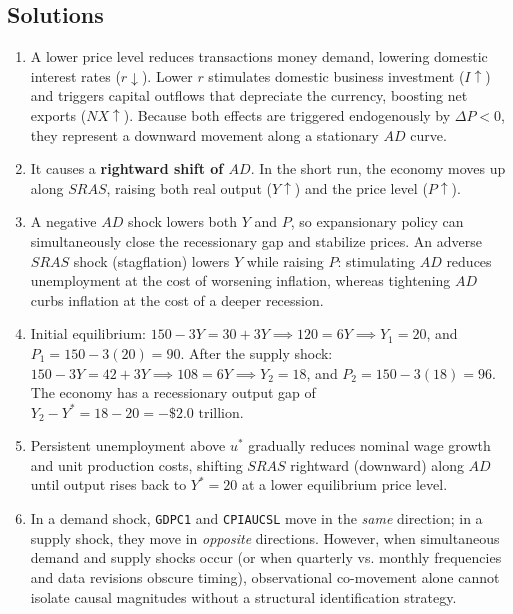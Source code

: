 \documentclass[11pt,letterpaper]{article}
\begin{document}
\subsection*{Solutions}
\begin{enumerate}
    \item A lower price level reduces transactions money demand, lowering domestic interest rates ($r \downarrow$). Lower $r$ stimulates domestic business investment ($I \uparrow$) and triggers capital outflows that depreciate the currency, boosting net exports ($NX \uparrow$). Because both effects are triggered endogenously by $\Delta P < 0$, they represent a downward movement along a stationary $AD$ curve.
    \item It causes a \textbf{rightward shift of $AD$}. In the short run, the economy moves up along $SRAS$, raising both real output ($Y \uparrow$) and the price level ($P \uparrow$).
    \item A negative $AD$ shock lowers both $Y$ and $P$, so expansionary policy can simultaneously close the recessionary gap and stabilize prices. An adverse $SRAS$ shock (stagflation) lowers $Y$ while raising $P$: stimulating $AD$ reduces unemployment at the cost of worsening inflation, whereas tightening $AD$ curbs inflation at the cost of a deeper recession.
    \item Initial equilibrium: $150 - 3Y = 30 + 3Y \implies 120 = 6Y \implies Y_1 = 20$, and $P_1 = 150 - 3(20) = 90$. After the supply shock: $150 - 3Y = 42 + 3Y \implies 108 = 6Y \implies Y_2 = 18$, and $P_2 = 150 - 3(18) = 96$. The economy has a recessionary output gap of $Y_2 - Y^* = 18 - 20 = -\$2.0\text{ trillion}$.
    \item Persistent unemployment above $u^*$ gradually reduces nominal wage growth and unit production costs, shifting $SRAS$ rightward (downward) along $AD$ until output rises back to $Y^* = 20$ at a lower equilibrium price level.
    \item In a demand shock, \texttt{GDPC1} and \texttt{CPIAUCSL} move in the \emph{same} direction; in a supply shock, they move in \emph{opposite} directions. However, when simultaneous demand and supply shocks occur (or when quarterly vs. monthly frequencies and data revisions obscure timing), observational co-movement alone cannot isolate causal magnitudes without a structural identification strategy.
\end{enumerate}
\end{document}
